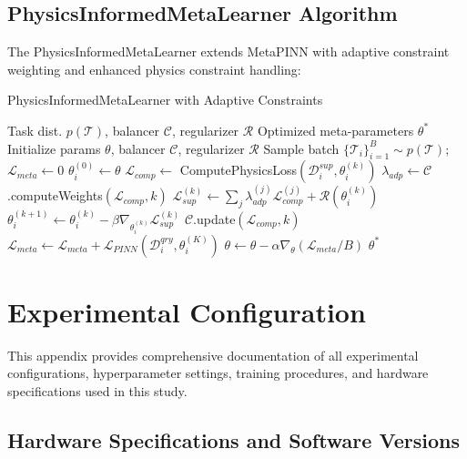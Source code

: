 \documentclass[review]{elsarticle}
\begin{document}
\subsection{PhysicsInformedMetaLearner Algorithm}

The PhysicsInformedMetaLearner extends MetaPINN with adaptive constraint weighting and enhanced physics constraint handling:

\begin{algorithm}[H]
\caption{PhysicsInformedMetaLearner with Adaptive Constraints}
\begin{algorithmic}[1]
\REQUIRE Task dist. $p(\mathcal{T})$, balancer $\mathcal{C}$, regularizer $\mathcal{R}$
\ENSURE Optimized meta-parameters $\theta^*$
\STATE Initialize params $\theta$, balancer $\mathcal{C}$, regularizer $\mathcal{R}$
    \STATE Sample batch $\{\mathcal{T}_i\}_{i=1}^B \sim p(\mathcal{T})$; $\mathcal{L}_{meta} \leftarrow 0$
        \STATE $\theta_i^{(0)} \leftarrow \theta$
            \STATE $\mathcal{L}_{comp} \leftarrow$ ComputePhysicsLoss$(\mathcal{D}_i^{sup}, \theta_i^{(k)})$
            \STATE $\lambda_{adp} \leftarrow \mathcal{C}$.computeWeights$(\mathcal{L}_{comp}, k)$
            \STATE $\mathcal{L}_{sup}^{(k)} \leftarrow \sum_j \lambda_{adp}^{(j)} \mathcal{L}_{comp}^{(j)} + \mathcal{R}(\theta_i^{(k)})$
            \STATE $\theta_i^{(k+1)} \leftarrow \theta_i^{(k)} - \beta \nabla_{\theta_i^{(k)}} \mathcal{L}_{sup}^{(k)}$
                \STATE $\mathcal{C}$.update$(\mathcal{L}_{comp}, k)$
            \ENDIF
        \ENDFOR
        \STATE $\mathcal{L}_{meta} \leftarrow \mathcal{L}_{meta} + \mathcal{L}_{PINN}(\mathcal{D}_i^{qry}, \theta_i^{(K)})$
    \ENDFOR
    \STATE $\theta \leftarrow \theta - \alpha \nabla_\theta (\mathcal{L}_{meta} / B)$
\ENDWHILE
\RETURN $\theta^*$
\end{algorithmic}
\end{algorithm}

\section{Experimental Configuration}
\label{appendix:experimental_config}

This appendix provides comprehensive documentation of all experimental configurations, hyperparameter settings, training procedures, and hardware specifications used in this study.

\subsection{Hardware Specifications and Software Versions}
\end{document}
